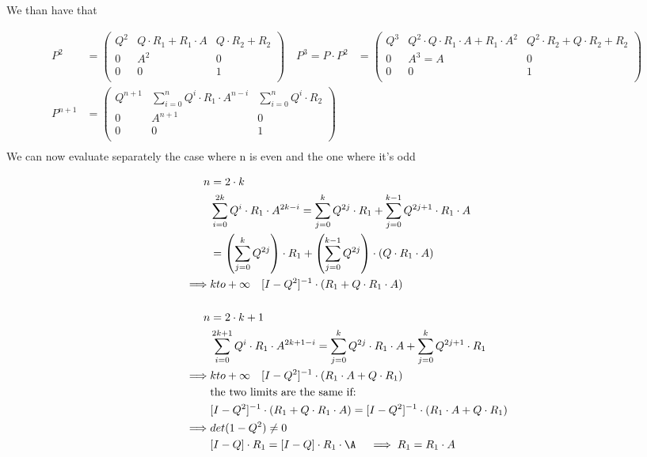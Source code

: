 We than have that

\begin{equation}\begin{split}
  P^2&=\begin{pmatrix}
      Q^2 & Q \cdot R_1 + R_1 \cdot A & Q \cdot R_2  + R_2\\
      0 & A^2   & 0 \\
      0 & 0   & 1 \\
  \end{pmatrix}
  \quad
  P^{3} = P \cdot P^2 &=\begin{pmatrix}
      Q^3 & Q^2 \cdot Q \cdot R_1\cdot A + R_1 \cdot A^2 & Q^2 \cdot R_2  + Q \cdot R_2 +R_2\\
      0 & A^3=A   & 0 \\
      0 & 0   & 1 \\
  \end{pmatrix}\\
  P^{n+1}&=\begin{pmatrix}
      Q^{n+1} & \sum\limits_{i=0}^n Q^i \cdot R_1 \cdot A^{n-i} & \sum\limits_{i=0}^n Q^i \cdot R_2\\
      0 & A^{n+1}   & 0 \\
      0 & 0   & 1 \\
  \end{pmatrix}\\
\end{split}\end{equation}
We can now evaluate separately the case where n is even and the one where it's odd

\begin{equation}\begin{split}
  n &= 2 \cdot k \\
  &\sum\limits_{i=0}^{2k}Q^i \cdot R_1 \cdot A^{2k-i} = \sum\limits_{j=0}^{k}Q^{2j} \cdot R_1 + \sum\limits_{j=0}^{k-1}Q^{2j+1} \cdot R_1 \cdot A \\
  &=\left(\sum\limits_{j=0}^{k}Q^{2j} \right) \cdot R_1 + \left(\sum\limits_{j=0}^{k-1}Q^{2j} \right) \cdot (Q \cdot R_1 \cdot A)\\
  \implies & k  to +\infty \quad [I - Q^2]^{-1} \cdot (R_1 + Q \cdot R_1 \cdot A)\\
  \\
  n &= 2 \cdot k + 1 \\
  &\sum\limits_{i=0}^{2k+1}Q^i \cdot R_1 \cdot A^{2k+1-i} = \sum\limits_{j=0}^{k}Q^{2j} \cdot R_1\cdot A + \sum\limits_{j=0}^{k}Q^{2j+1} \cdot R_1 \\
  \implies & k  to +\infty \quad [I - Q^2]^{-1} \cdot (R_1 \cdot A + Q \cdot R_1 ) \\
  &\text{the two limits are the same if: }\\
  & [I - Q^2]^{-1} \cdot (R_1 + Q \cdot R_1 \cdot A) = [I - Q^2]^{-1} \cdot (R_1 \cdot A + Q \cdot R_1 )\\
  \implies & det(1-Q^2)\neq 0\\
  & [I-Q ]\cdot R_1 = [I-Q]\cdot R_1 \cdot \A \quad \implies R_1 = R_1 \cdot A

\end{split}\end{equation}


